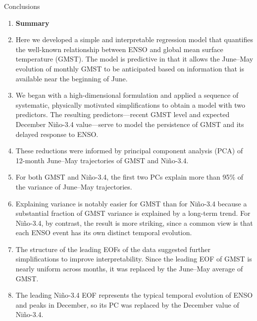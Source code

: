 \documentclass[aspectratio=169,xcolor=dvipsnames]{beamer}
\begin{document}
\begin{frame}[allowframebreaks]{Conclusions}
  
  \begin{enumerate}\fontsize{6pt}{8pt}\selectfont
  \item \textbf{Summary}

  \item Here we developed a simple and interpretable regression model
    that quantifies the well-known relationship between ENSO and
    global mean surface temperature (GMST). The model is predictive in
    that it allows the June--May evolution of monthly GMST to be
    anticipated based on information that is available near the
    beginning of June.

  \item We began with a high-dimensional formulation and applied a
    sequence of systematic, physically motivated simplifications to
    obtain a model with two predictors. The resulting
    predictors---recent GMST level and expected December Ni\~no-3.4
    value---serve to model the persistence of GMST and its delayed
    response to ENSO.

  \item These reductions were informed by principal component analysis
    (PCA) of 12-month June--May trajectories of GMST and Ni\~no-3.4.

  \item For both GMST and Ni\~no-3.4, the first two PCs explain more
    than 95\% of the variance of June--May trajectories.

  \item Explaining variance is notably easier for GMST than for
    Ni\~no-3.4 because a substantial fraction of GMST variance is
    explained by a long-term trend.  For Ni\~no-3.4, by contrast, the
    result is more striking, since a common view is that each ENSO
    event has its own distinct temporal evolution.
  
  \item The structure of the leading EOFs of the data suggested
    further simplifications to improve interpretability. Since the
    leading EOF of GMST is nearly uniform across months, it was
    replaced by the June--May average of GMST.

  \item The leading Ni\~no-3.4 EOF represents the typical temporal
    evolution of ENSO and peaks in December, so its PC was replaced by
    the December value of Ni\~no-3.4.
    

\end{enumerate}
\end{frame}
\end{document}
